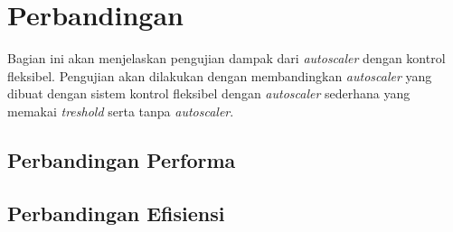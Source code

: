 \section{Perbandingan}

Bagian ini akan menjelaskan pengujian dampak dari \textit{autoscaler} dengan kontrol fleksibel. Pengujian akan dilakukan dengan membandingkan \textit{autoscaler} yang dibuat dengan sistem kontrol fleksibel dengan \textit{autoscaler} sederhana yang memakai \textit{treshold} serta tanpa \textit{autoscaler}. 

\subsection{Perbandingan Performa}

\subsection{Perbandingan Efisiensi}